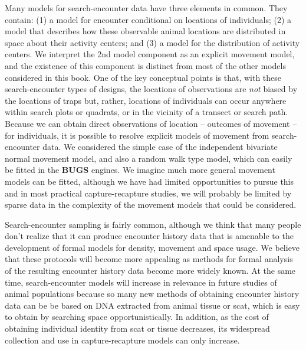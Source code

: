 Many models for search-encounter data have three elements in common. They contain: 
(1) a model for encounter conditional on locations of
individuals; (2) a model that describes how these observable animal
locations are distributed in space about their activity centers; and
(3) a model for the distribution of activity centers.  We interpret
the 2nd model component as an explicit movement model, and the
existence of this component is distinct from most of the other models
considered in this book.
One of the key conceptual points is that, with these search-encounter
types of designs, the locations of observations are {\it not} biased
by the locations of traps but, rather, locations of individuals can
occur anywhere within search plots or quadrats, or in the vicinity of
a transect or search path.  Because we can obtain direct observations
of location -- outcomes of movement -- for individuals, it is possible
to resolve explicit models of movement from search-encounter data.  We
considered the simple case of the independent bivariate normal
movement model, and also a random walk type model, which can easily be
fitted in the {\bf BUGS} engines.  We imagine much more general
movement models can be fitted, although we have had limited
opportunities to pursue this and in most practical capture-recapture
studies, we will probably be limited by sparse data in the complexity
of the movement models that could be considered.

Search-encounter sampling is fairly common, although we think that
many people don't realize that it can produce encounter history data
that is amenable to the development of formal models for density,
movement and space usage. We believe that these protocols will become
more appealing as methods for formal analysis of the resulting
encounter history data become more widely known.  At the same time,
search-encounter models will increase in relevance in future studies
of animal populations because so many new methods of obtaining
encounter history data can be be based on DNA extracted from animal
tissue or scat, which is easy to obtain by searching space
opportunistically.  In addition, as the cost of obtaining individual
identity from scat or tissue decreases, its widespread collection and
use in capture-recapture models can only increase.
